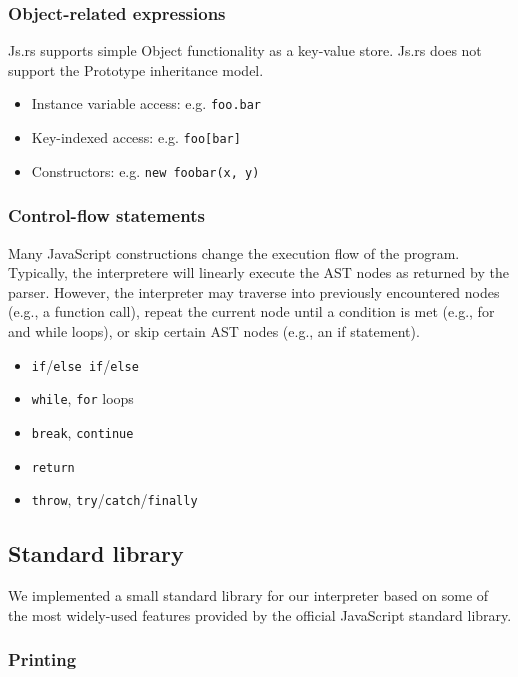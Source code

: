 \documentclass{article}
\begin{document}
\begin{multicols}{2}
\subsubsection*{Object-related expressions}

Js.rs supports simple Object functionality as a key-value store. Js.rs does not
support the Prototype inheritance model.

\begin{itemize}
  \item Instance variable access: e.g. \texttt{foo.bar}
  \item Key-indexed access: e.g. \texttt{foo[bar]}
  \item Constructors: e.g. \texttt{new foobar(x, y)}
\end{itemize}

\subsubsection*{Control-flow statements}

Many JavaScript constructions change the execution flow of the program.
Typically, the interpretere will linearly execute the AST nodes as returned by
the parser. However, the interpreter may traverse into previously encountered
nodes (e.g., a function call), repeat the current node until a condition is met
(e.g., for and while loops), or skip certain AST nodes (e.g., an if statement).

\begin{itemize}
  \item \texttt{if}/\texttt{else if}/\texttt{else}
  \item \texttt{while}, \texttt{for} loops
  \item \texttt{break}, \texttt{continue}
  \item \texttt{return}
  \item \texttt{throw}, \texttt{try}/\texttt{catch}/\texttt{finally}
\end{itemize}

\subsection*{Standard library}

We implemented a small standard library for our interpreter based on some of the
most widely-used features provided by the official JavaScript standard library.

\subsubsection*{Printing}


\end{multicols}
\end{document}
